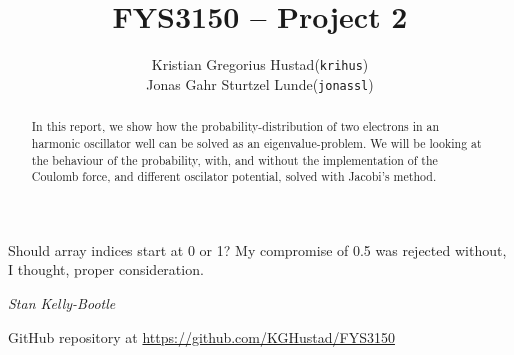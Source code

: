 \documentclass[a4paper]{article}
\begin{document}
\title{FYS3150 -- Project 2}
\author{
    \begin{tabular}{r l}
        Kristian Gregorius Hustad & (\texttt{krihus})\\
        Jonas Gahr Sturtzel Lunde & (\texttt{jonassl})
    \end{tabular}}

\maketitle



\setlength{\epigraphwidth}{0.75\textwidth}
\renewcommand{\epigraphflush}{center}
\renewcommand{\beforeepigraphskip}{50pt}
\renewcommand{\afterepigraphskip}{100pt}
\renewcommand{\epigraphsize}{\normalsize}

\epigraph{Should array indices start at 0 or 1?  My compromise of 0.5 was rejected without, I thought, proper consideration.}
{\textit{Stan Kelly-Bootle}}


\begin{abstract}
\noindent
In this report, we show how the probability-distribution of two electrons in an harmonic oscillator well can be solved as an eigenvalue-problem. We will be looking at the behaviour of the probability, with, and without the implementation of the Coulomb force, and different oscilator potential, solved with Jacobi's method.
\end{abstract}

\vfill


\begin{center}
    GitHub repository at \url{https://github.com/KGHustad/FYS3150}
\end{center}

\newpage

\newcommand{\half}{\frac{1}{2}}
\newcommand{\dx}{{\Delta x}}
\newcommand{\bigO}{{\mathcal{O}}}
\end{document}
